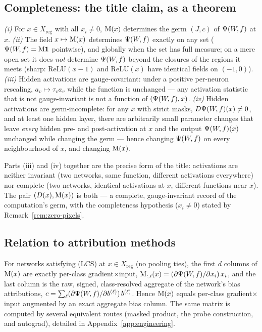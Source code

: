 \subsection{Completeness: the title claim, as a theorem}
\label{sec:completeness}

\begin{theorem}\label{thm:complete}
\emph{(i)} For $x\in X_{\mathrm{reg}}$ with all $x_i\neq0$, $\mathrm{M}(x)$ determines
the germ $(J,c)$ of $\Psi(W\!,f)$ at $x$. \emph{(ii)} The field $x\mapsto\mathrm{M}(x)$
determines $\Psi(W\!,f)$ exactly on any set ($\Psi(W\!,f)=\mathrm{M}\mathbf 1$ pointwise), and globally
when the set has full measure; on a mere open set it does \emph{not} determine
$\Psi(W\!,f)$ beyond the closures of the regions it meets (sharp: $\mathrm{ReLU}(x{-}1)$
and $\mathrm{ReLU}(x)$ have identical fields on $(-1,0)$).
\emph{(iii)} Hidden activations are gauge-covariant: under a positive
per-neuron rescaling, $a_v\mapsto\tau_v a_v$ while the function is unchanged
--- any activation statistic that is not gauge-invariant is not a function of
$(\Psi(W\!,f),x)$. \emph{(iv)} Hidden activations are germ-incomplete: for any $x$ with
strict masks, $D\Psi(W\!,f)(x)\neq0$, and at least one hidden layer, there are
arbitrarily small parameter changes that leave \emph{every} hidden pre- and
post-activation at $x$ and the output $\Psi(W\!,f)(x)$ unchanged while changing the germ
--- hence changing $\Psi(W\!,f)$ on every neighbourhood of $x$, and changing $\mathrm{M}(x)$.
\end{theorem}

Parts (iii) and (iv) together are the precise form of the title: activations
are neither invariant (two networks, same function, different activations
everywhere) nor complete (two networks, identical activations at $x$,
different functions near $x$). The pair $(D(x),\mathrm{M}(x))$ is both --- a complete,
gauge-invariant record of the computation's germ, with the completeness
hypothesis ($x_i\neq0$) stated by Remark~\ref{rem:zero-pixels}.

\subsection{Relation to attribution methods}
\label{sec:attribution}

\begin{theorem}[Knowledge matrix $=$ gradient$\times$input $\oplus$ bias attribution]\label{thm:weff}
For networks satisfying (LCS) at $x\in X_{\mathrm{reg}}$ (no pooling ties), the first $d$
columns of $\mathrm{M}(x)$ are exactly per-class gradient$\times$input,
$\mathrm{M}_{:,i}(x)=(\partial\Psi(W\!,f)/\partial x_i)\,x_i$, and the last column is the raw,
signed, class-resolved aggregate of the network's bias attributions,
$c=\sum_\ell(\partial\Psi(W\!,f)/\partial b^{(\ell)})\,b^{(\ell)}$. Hence $\mathrm{M}(x)$ equals
per-class gradient$\times$input augmented by an exact aggregate bias column. The
same matrix is computed by several equivalent routes (masked product, the probe
construction, and autograd), detailed in Appendix~\ref{app:engineering}.
\end{theorem}

